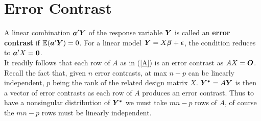 \section{Error Contrast}
\label{app:error_contrast}

A linear combination $\boldsymbol{a}'\boldsymbol{Y}$ of the response variable $\boldsymbol{Y}$ is called an \textbf{error contrast} if $\mathbb{E}(\boldsymbol{a}'\boldsymbol{Y}) = 0$. For a linear model $\boldsymbol{Y} = X\boldsymbol{\beta} + \boldsymbol{\epsilon}$, the condition reduces to $\boldsymbol{a}'X = \boldsymbol{0}$. \\[0.5em]

It readily follows that each row of $A$ as in (\ref{A}) is an error contrast as $AX = \boldsymbol{O}$. Recall the fact that, given $n$ error contrasts, at max $n-p$ can be linearly independent, $p$ being the rank of the related design matrix $X$. $\boldsymbol{Y^*} = A\boldsymbol{Y}$ is then a vector of error contrasts as each row of $A$ produces an error contrast. Thus to have a nonsingular distribution of $\boldsymbol{Y^*}$ we must take $mn-p$ rows of $A$, of course the $mn-p$ rows must be linearly independent.